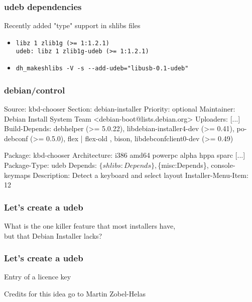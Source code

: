 \documentclass{beamer}
\begin{document}
\begin{frame}[fragile]
  \frametitle{udeb dependencies}
	Recently added "type" support in shlibs files
	\begin{itemize}
	\item
		\begin{small}
		\begin{verbatim}
libz 1 zlib1g (>= 1:1.2.1)
udeb: libz 1 zlib1g-udeb (>= 1:1.2.1)
		\end{verbatim}
		\end{small}
	\item
		\begin{small}
		\begin{verbatim}
dh_makeshlibs -V -s --add-udeb="libusb-0.1-udeb"
		\end{verbatim}
		\end{small}
	\end{itemize}
\end{frame}

\begin{frame}[fragile]
  \frametitle{debian/control}
\begin{tiny}
\begin{semiverbatim}
Source: kbd-chooser
Section: debian-installer
Priority: optional
Maintainer: Debian Install System Team <debian-boot@lists.debian.org>
Uploaders: [...]
Build-Depends: debhelper (>= 5.0.22), libdebian-installer4-dev (>= 0.41),
               po-debconf (>= 0.5.0), flex | flex-old , bison,
               libdebconfclient0-dev (>= 0.49)

Package: kbd-chooser
Architecture: i386 amd64 powerpc alpha hppa sparc [...]
\color{red}Package-Type: udeb\normalcolor
Depends: $\{shlibs:Depends\}, $\{misc:Depends\}, console-keymaps
Description: Detect a keyboard and select layout
\color{red}Installer-Menu-Item: 12\normalcolor
\end{semiverbatim}
\end{tiny}
\end{frame}

\begin{frame}
  \frametitle{Let's create a udeb}
	What is the one killer feature that most installers have, \\
	but that Debian Installer lacks?
\end{frame}

\begin{frame}
  \frametitle{Let's create a udeb}
\begin{huge}
	Entry of a licence key
\end{huge}
\bigskip
\bigskip
\begin{tiny}
\begin{flushright}
Credits for this idea go to Martin Zobel-Helas
\end{flushright}
\end{tiny}
\end{frame}
\end{document}
